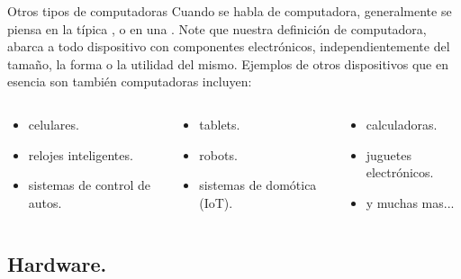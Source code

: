 \begin{frame}[shrink]{Otros tipos de computadoras}
  Cuando se habla de computadora, generalmente se piensa en la típica
  , o en una .
  \jump
  Note que nuestra definición de computadora, abarca a todo dispositivo con
  componentes electrónicos, independientemente del tamaño, la forma o la utilidad
  del mismo.
  \jump
  Ejemplos de otros dispositivos que en esencia son también computadoras incluyen:
  \begin{columns}
    \begin{column}{0.33\textwidth}
      \begin{itemize}
        \item celulares.
        \item relojes inteligentes.
        \item sistemas de control de autos.
      \end{itemize}
    \end{column}
    \begin{column}{0.33\textwidth}
      \begin{itemize}
        \item tablets.
        \item robots.
        \item sistemas de domótica (IoT).
      \end{itemize}
    \end{column}
    \begin{column}{0.33\textwidth}
      \begin{itemize}
        \item calculadoras.
        \item juguetes electrónicos.
        \item y muchas mas...
      \end{itemize}
    \end{column}
  \end{columns}
\end{frame}


\subsection{Hardware.}


